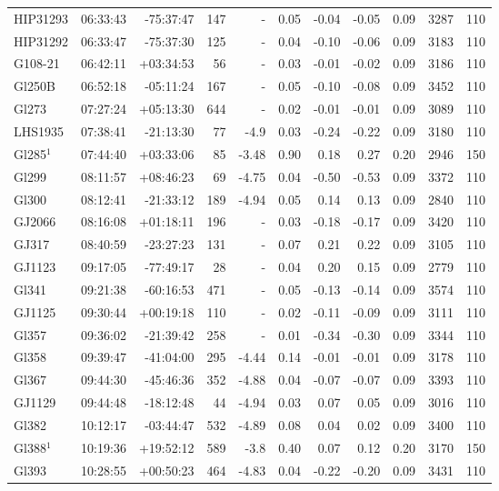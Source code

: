 \documentclass{aa}
\begin{document}
{\begin{longtable}{l r r r r r r r r r r}
HIP31293 & 06:33:43 & -75:37:47 & 147 &    - & 0.05 & -0.04 & -0.05 & 0.09 & 3287 &  110 \\
HIP31292 & 06:33:47 & -75:37:30 & 125 &    - & 0.04 & -0.10 & -0.06 & 0.09 & 3183 &  110 \\
G108-21 & 06:42:11 & +03:34:53 & 56 &    - & 0.03 & -0.01 & -0.02 & 0.09 & 3186 &  110 \\
Gl250B & 06:52:18 & -05:11:24 & 167 &    - & 0.05 & -0.10 & -0.08 & 0.09 & 3452 &  110 \\
Gl273 & 07:27:24 & +05:13:30 & 644 &    - & 0.02 & -0.01 & -0.01 & 0.09 & 3089 &  110 \\
LHS1935 & 07:38:41 & -21:13:30 & 77 & -4.9 & 0.03 & -0.24 & -0.22 & 0.09 & 3180 &  110 \\
Gl285$^1$ & 07:44:40 & +03:33:06 & 85 & -3.48 & 0.90 & 0.18 & 0.27 & 0.20 & 2946 &  150 \\
Gl299 & 08:11:57 & +08:46:23 & 69 & -4.75 & 0.04 & -0.50 & -0.53 & 0.09 & 3372 &  110 \\
Gl300 & 08:12:41 & -21:33:12 & 189 & -4.94 & 0.05 & 0.14 & 0.13 & 0.09 & 2840 &  110 \\
GJ2066 & 08:16:08 & +01:18:11 & 196 &    - & 0.03 & -0.18 & -0.17 & 0.09 & 3420 &  110 \\
GJ317 & 08:40:59 & -23:27:23 & 131 &    - & 0.07 & 0.21 & 0.22 & 0.09 & 3105 &  110 \\
GJ1123 & 09:17:05 & -77:49:17 & 28 &    - & 0.04 & 0.20 & 0.15 & 0.09 & 2779 &  110 \\
Gl341 & 09:21:38 & -60:16:53 & 471 &    - & 0.05 & -0.13 & -0.14 & 0.09 & 3574 &  110 \\
GJ1125 & 09:30:44 & +00:19:18 & 110 &    - & 0.02 & -0.11 & -0.09 & 0.09 & 3111 &  110 \\
Gl357 & 09:36:02 & -21:39:42 & 258 &    - & 0.01 & -0.34 & -0.30 & 0.09 & 3344 &  110 \\
Gl358 & 09:39:47 & -41:04:00 & 295 & -4.44 & 0.14 & -0.01 & -0.01 & 0.09 & 3178 &  110 \\
Gl367 & 09:44:30 & -45:46:36 & 352 & -4.88 & 0.04 & -0.07 & -0.07 & 0.09 & 3393 &  110 \\
GJ1129 & 09:44:48 & -18:12:48 & 44 & -4.94 & 0.03 & 0.07 & 0.05 & 0.09 & 3016 &  110 \\
Gl382 & 10:12:17 & -03:44:47 & 532 & -4.89 & 0.08 & 0.04 & 0.02 & 0.09 & 3400 &  110 \\
Gl388$^1$ & 10:19:36 & +19:52:12 & 589 & -3.8 & 0.40 & 0.07 & 0.12 & 0.20 & 3170 &  150 \\
Gl393 & 10:28:55 & +00:50:23 & 464 & -4.83 & 0.04 & -0.22 & -0.20 & 0.09 & 3431 &  110 \\

\end{longtable}}
\end{document}
